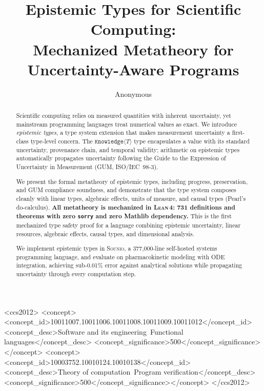 \documentclass[acmsmall,screen,review,anonymous]{acmart}
\newcommand{\sounio}{\textsc{Sounio}\xspace}
\newcommand{\know}[1]{\texttt{Knowledge}\langle #1 \rangle}
\newcommand{\lean}{\textsc{Lean\,4}\xspace}
\begin{document}
\title{Epistemic Types for Scientific Computing: \\
Mechanized Metatheory for Uncertainty-Aware Programs}

\author{Anonymous}

\begin{abstract}
Scientific computing relies on measured quantities with inherent uncertainty,
yet mainstream programming languages treat numerical values as exact.
We introduce \emph{epistemic types}, a type system extension that makes
measurement uncertainty a first-class type-level concern.
The $\know{T}$ type encapsulates a value with its standard
uncertainty, provenance chain, and temporal validity; arithmetic on
epistemic types automatically propagates uncertainty following the
Guide to the Expression of Uncertainty in Measurement (GUM, ISO/IEC~98-3).

We present the formal metatheory of epistemic types, including
progress, preservation, and GUM compliance soundness, and demonstrate
that the type system composes cleanly with linear types, algebraic
effects, units of measure, and causal types (Pearl's do-calculus).
\textbf{All metatheory is mechanized in \lean: 731 definitions and
theorems with zero \texttt{sorry} and zero Mathlib dependency.}
This is the first mechanized type safety proof for a language combining
epistemic uncertainty, linear resources, algebraic effects, causal
types, and dimensional analysis.

We implement epistemic types in \sounio, a 377{,}000-line self-hosted systems
programming language, and evaluate on pharmacokinetic modeling with
ODE integration, achieving sub-0.01\% error against analytical
solutions while propagating uncertainty through every computation step.
\end{abstract}

\begin{CCSXML}
<ccs2012>
<concept><concept_id>10011007.10011006.10011008.10011009.10011012</concept_id>
<concept_desc>Software and its engineering~Functional languages</concept_desc>
<concept_significance>500</concept_significance></concept>
<concept><concept_id>10003752.10010124.10010138</concept_id>
<concept_desc>Theory of computation~Program verification</concept_desc>
<concept_significance>500</concept_significance></concept>
</ccs2012>
\end{CCSXML}

\end{document}
